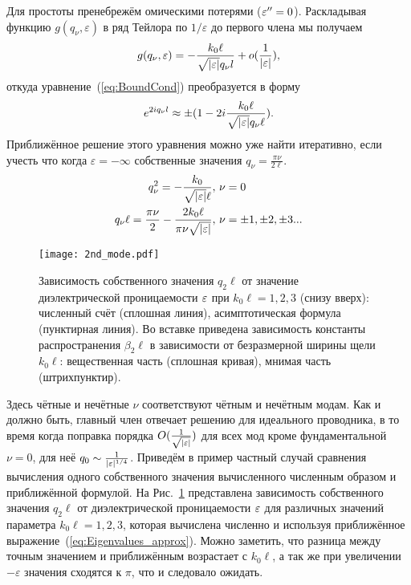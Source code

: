 Для простоты пренебрежём омическими потерями ($\varepsilon'' = 0$). Раскладывая функцию $g(q_\nu,\varepsilon)$ в ряд Тейлора по $1/\varepsilon$ до первого члена мы получаем
\begin{equation*}
g(q_\nu,\varepsilon) = -\frac{k_0 \ell}{\sqrt{\lvert\varepsilon\rvert}q_\nu l} + o(\frac{1}{\lvert\varepsilon\rvert}),
\end{equation*}
откуда уравнение~(\ref{eq:BoundCond}) преобразуется в форму
\begin{equation}
e^{2i q_\nu l} \approx \pm(1 - 2i\frac{k_0 \ell}{\sqrt{\lvert\varepsilon\rvert} q_\nu \ell}).\label{eq:BoundCond_simple}
\end{equation}
Приближённое решение этого уравнения можно уже найти итеративно, если учесть что когда $\varepsilon = -\infty$ собственные значения
$q_\nu = \frac{\pi \nu}{2 \ell}$.
\begin{align}
q_\nu^2  = -\frac{k_0}{ \sqrt{\lvert\varepsilon\rvert} \ell}, &\ \nu = 0 \nonumber \\
q_\nu \ell = \frac{\pi \nu}{2} - \frac{2k_0\ell}{\pi \nu \sqrt{\lvert\varepsilon\rvert}}, &\ \nu = \pm 1,\pm 2,\pm 3...\label{eq:Eigenvalues_approx}
\end{align}
\begin{figure}
\texttt{[image: 2nd\_mode.pdf]}
  \caption{Зависимость собственного значения $q_2\ell$ от значение диэлектрической проницаемости $\varepsilon$ при $k_0 \ell = 1,2,3$ (снизу вверх):
  численный счёт (сплошная линия), асимптотическая формула (пунктирная линия). Во вставке приведена зависимость константы распространения 
  $\beta_2 \ell$ в зависимости от безразмерной ширины щели $k_0\ell$: вещественная часть (сплошная кривая), мнимая часть (штрихпунктир).}
  \label{fig:2nd_mode}
\end{figure}
Здесь чётные и нечётные $\nu$ соответствуют чётным и нечётным модам. Как и должно быть, главный член отвечает решению для идеального
проводника, в то время когда поправка порядка $O(\frac{1}{\sqrt{\lvert\varepsilon\rvert}})$ для всех мод кроме фундаментальной $\nu = 0$, для 
неё $q_0 \sim \frac{1}{\lvert\varepsilon\rvert^{1/4}}$. Приведём в пример частный случай сравнения вычисления одного собственного значения
вычисленного численным образом и приближённой формулой. На Рис.~\ref{fig:2nd_mode} представлена зависимость собственного значения $q_2\ell$ от 
диэлектрической проницаемости  $\varepsilon$ для различных значений параметра $k_0 \ell = 1,2,3$, которая вычислена численно и используя 
приближённое выражение~(\ref{eq:Eigenvalues_approx}). Можно заметить, что разница между точным значением и приближённым возрастает с 
 $k_0 \ell$, а так же при увеличении $-\varepsilon$ значения сходятся к $\pi$, что и следовало ожидать. 

